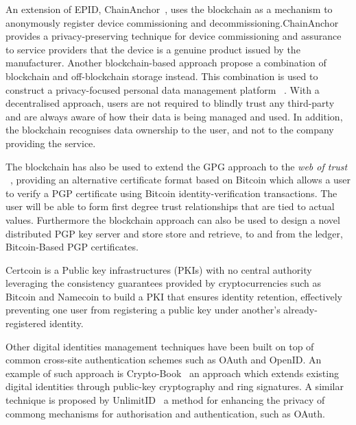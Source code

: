 An extension of EPID, ChainAnchor~\cite{hardjono2016cloud}, uses the blockchain as a mechanism to anonymously register device  commissioning  and  decommissioning.ChainAnchor provides a privacy-preserving technique for device commissioning and assurance to service providers that the device is a genuine product issued by the manufacturer. Another blockchain-based approach propose a combination of blockchain and off-blockchain storage instead. This combination is used to construct a privacy-focused personal data management platform ~\cite{zyskind2015decentralizing}. With a decentralised approach, users are not required to blindly trust any third-party and are always aware of how their data is being managed and used. In addition, the blockchain recognises data ownership to the user, and not to the company providing the service.

The blockchain has also be used to extend the GPG approach to the \emph{web of trust} ~\cite{wilson2015pretty, cryptoeprint:2016:469}, providing an alternative certificate format based on Bitcoin which allows a user to verify a PGP certificate using Bitcoin identity-verification transactions. The user will be able to form first degree trust relationships that are tied to actual values. Furthermore the blockchain approach can also be used to design a novel distributed PGP key server and store store and retrieve, to and from the ledger,  Bitcoin-Based PGP  certificates.  

Certcoin is a Public key infrastructures (PKIs) with no  central authority ~\cite{fromknecht2014decentralized} leveraging the consistency guarantees provided by cryptocurrencies such as Bitcoin and Namecoin to build a PKI that ensures identity retention, effectively preventing one user from registering a public key under another’s already-registered identity.

Other digital identities management techniques have been built on top of common cross-site authentication schemes such as OAuth and OpenID. An example of such approach is Crypto-Book~\cite{maheswaran2013crypto} an approach which extends existing digital identities through public-key cryptography and ring signatures. A similar technique is proposed by UnlimitID~\cite{isaakidis2016unlimitid} a method for enhancing the privacy of commong mechanisms for authorisation and authentication, such as OAuth.